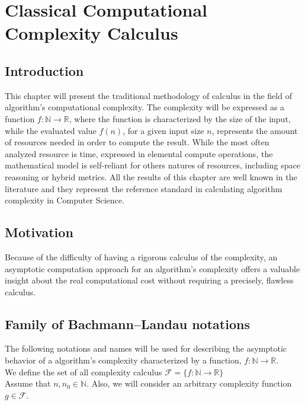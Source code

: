 

\chapter{Classical Computational Complexity Calculus }


\section{Introduction}
This chapter will present the traditional methodology of calculus in the field of algorithm's computational complexity. The complexity will be expressed as a function $f:\mathbb{N}\longrightarrow\mathbb{R}$, where the function is characterized by the size of the input, while the evaluated value $f(n)$, for a given input size $n$, represents the amount of resources needed in order to compute the result. While the most often analyzed resource is time, expressed in elemental compute operations, the mathematical model is self-reliant for others natures of resources, including space reasoning or hybrid metrics. All the results of this chapter are well known in the literature and they represent the reference standard in calculating algorithm complexity in Computer Science. 

\section{Motivation}
Because of the difficulty of having a rigorous calculus of the complexity, an asymptotic computation approach for an algorithm's complexity offers a valuable insight about the real computational cost without requiring a precisely, flawless calculus.



\section{Family of Bachmann–Landau notations}
The following notations and names will be used for describing the asymptotic behavior of a algorithm's complexity characterized by a function, $f:\mathbb{N}\longrightarrow\mathbb{R}$. \\
We define the set of all complexity calculus $\mathcal{F}= \lbrace f:\mathbb{N}\longrightarrow\mathbb{R} \rbrace$
\\Assume that $n, n_{0}\in\mathbb{N}$. Also, we will consider an arbitrary complexity function $g \in \mathcal{F}$. \\

